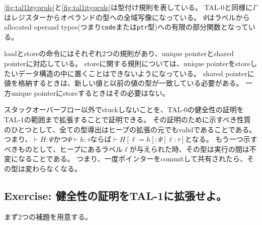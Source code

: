 \documentclass[a4paper,oneside]{ltjsarticle}
\begin{document}
\autoref{fig:tal1htyprule}と\autoref{fig:tal1ityprule}は型付け規則を表している。
TAL-0と同様に$\Gamma$はレジスターからオペランドの型への全域写像になっている。
$\Psi$はラベルからallocated operand types(つまり\texttt{code}または\texttt{ptr}型)への有限の部分関数となっている。

loadとstoreの命令にはそれぞれ2つの規則があり、unique pointerとshared pointerに対応している。
storeに関する規則については、unique pointerをstoreしたいデータ構造の中に置くことはできないようになっている。
shared pointerに値を格納するときは、新しい値と以前の値の型が一致している必要がある。
一方unique pointerにstoreするときはその必要はない。

スタックオーバーフロー以外でstuckしないことを、TAL-0の健全性の証明をTAL-1の範囲まで拡張することで証明できる。
その証明のために示すべき性質のひとつとして、全ての型導出はヒープの拡張の元でもvalidであることである。
つまり、$\vdash H:\Psi$かつ$\Psi\vdash h:\tau$ならば$\vdash H[\ell=h]:\Psi[\ell:\tau]$となる。
もう一つ示すべきものとして、ヒープにあるラベル$\ell$が与えられた時、その型は実行の間は不変になることである。
つまり、一度ポインターをcommitして共有されたら、その型は変わらなくなる。
\subsection{Exercise: 健全性の証明をTAL-1に拡張せよ。}
まず2つの補題を用意する。
\end{document}
